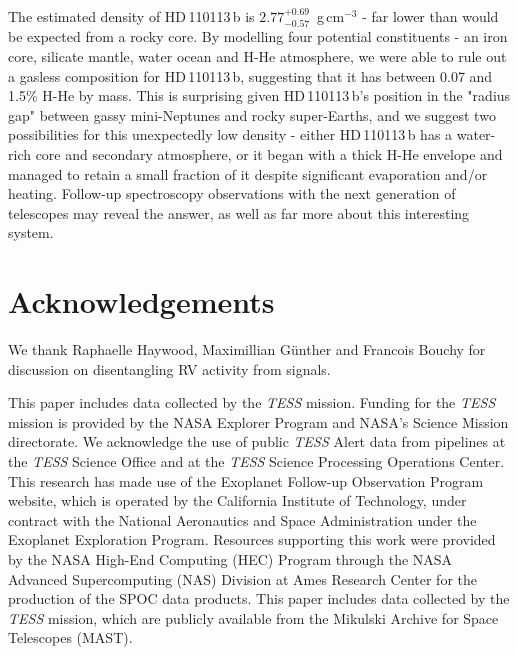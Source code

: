 \documentclass[fleqn,usenatbib]{mnras}
\newcommand{\gcm}{g\,cm$^{-3}$}	%
\newcommand{\tess}{{\it TESS}}
\newcommand{\Trhopgcmthree}{ $ 2.77^{+0.69}_{-0.57} $ }
\newcommand{\Tplanet}{HD\,110113\,b}
\begin{document}
The estimated density of \Tplanet{} is \Trhopgcmthree{}\,\gcm{} - far lower than would be expected from a rocky core.
By modelling four potential constituents - an iron core, silicate mantle, water ocean and H-He atmosphere, we were able to rule out a gasless composition for \Tplanet{}, suggesting that it has between 0.07 and 1.5\% H-He by mass.
This is surprising given \Tplanet{}'s position in the "radius gap" between gassy mini-Neptunes and rocky super-Earths, and we suggest two possibilities for this unexpectedly low density - either \Tplanet{} has a water-rich core and secondary atmosphere, or it began with a thick H-He envelope and managed to retain a small fraction of it despite significant evaporation and/or heating.
Follow-up spectroscopy observations with the next generation of telescopes may reveal the answer, as well as far more about this interesting system.



\section*{Acknowledgements}
We thank Raphaelle Haywood, Maximillian G{\"u}nther and Francois Bouchy for discussion on disentangling RV activity from signals.

This paper includes data collected by the \tess{} mission.
Funding for the \tess{} mission is provided by the NASA Explorer Program and NASA's Science Mission directorate. 
We acknowledge the use of public \tess{} Alert data from pipelines at the \tess{} Science Office and at the \tess{} Science Processing Operations Center. 
This research has made use of the Exoplanet Follow-up Observation Program website, which is operated by the California Institute of Technology, under contract with the National Aeronautics and Space Administration under the Exoplanet Exploration Program. 
Resources supporting this work were provided by the NASA High-End Computing (HEC) Program through the NASA Advanced Supercomputing (NAS) Division at Ames Research Center for the production of the SPOC data products. 
This paper includes data collected by the \tess{} mission, which are publicly available from the Mikulski Archive for Space Telescopes (MAST).
\end{document}
